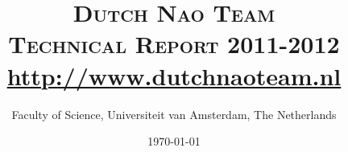 \documentclass[a4paper]{article}
\begin{document}
\thispagestyle{empty}
\title{\LARGE\textsc{Dutch Nao Team}\\\normalsize \textsc{Technical Report 2011-2012}\\\url{http://www.dutchnaoteam.nl}}
\author{Faculty of Science, Universiteit van Amsterdam, The Netherlands}
\date{\today}
\maketitle

\begin{figure}[htb]    	
\centering
{}
\label{fig:TeamPhoto}
\end{figure}

\begin{figure}[htb]
\centering
{} %
\label{fig:DNTLogo}
\end{figure}

\clearpage
\thispagestyle{empty}
\tableofcontents
\thispagestyle{empty}

\newpage
\setcounter{page}{1}
\end{document}
